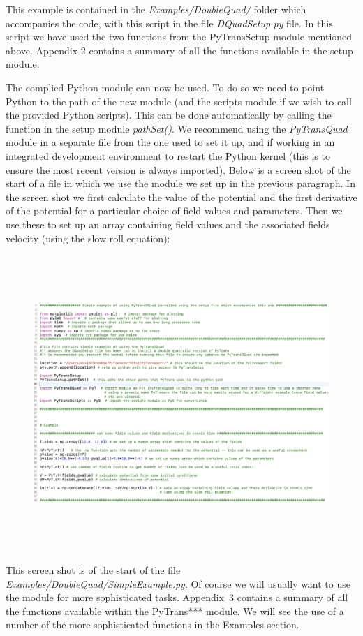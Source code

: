\documentclass[10pt,
amsmath,amssymb,
aps,prd,nofootinbib,eqsecnum,a4paper]{revtex4}
\begin{document}
\noindent This example is contained in the {\it Examples/DoubleQuad/} folder which accompanies the code, with this script in the file 
{\it DQuadSetup.py} file. In this script 
we have used the two functions from the PyTransSetup module mentioned above. 
Appendix 2 contains a summary of all the functions 
available in the setup module.

The complied Python module can now be used. To do so we need to point Python to the path of the new module (and 
the scripts module if we wish to call the provided Python scripts). This can be done automatically 
by calling the function in the setup module {\it pathSet()}. We recommend using the {\it PyTransQuad} 
module in a separate file from the one used to set it up, and if working in an integrated development environment to restart the Python kernel (this is to ensure the most recent version is always imported). Below is a screen shot of the start of a file in which we use the module we set up in the previous paragraph. In the screen shot we first calculate the value of the potential and the first derivative of the potential 
for a particular choice of field values and parameters. Then we use 
these to set up an array containing field values and the associated fields velocity (using the slow roll
equation):


\begin{figure}[H]
\centering
\includegraphics[width=18cm, height=11.2cm]{shot2b}
\end{figure}

\noindent This screen shot is of the start of the file {\it Examples/DoubleQuad/SimpleExample.py}. Of course we will usually want 
to use the module for more sophisticated tasks. Appendix~3 contains a summary 
of all the functions  available within the { PyTrans***} module. We will see the use of a number of the more sophisticated functions in the Examples section.
\end{document}
